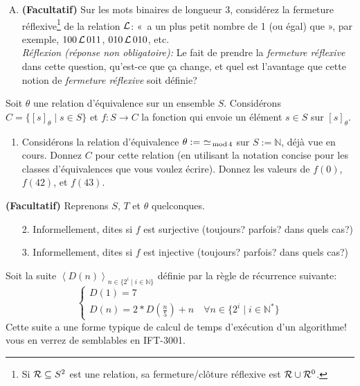 \documentclass[11pt]{article}
\newcommand{\tuple}[1]{\ensuremath{\left\langle #1 \right\rangle}}  %
\newcounter{exercice}\newcommand{\exercice}{ \bigskip \addtocounter{exercice}{1}\noindent \textbf{Exercice \theexercice}\\}
\renewcommand{\mod}{\textrm{\,mod\,}}
\begin{document}
\begin{enumerate}[B)]
\item \textbf{(Facultatif)}  Sur les mots binaires de longueur 3, considérez la fermeture réflexive\footnote{Si ${\cal R}\subseteq S^2$ est une relation, sa fermeture/clôture réflexive est ${\cal R}\cup {\cal R}^0$.} de la relation ${\cal L}$: «~a un plus petit nombre de 1  (ou égal) que », par exemple, $100\,{\cal L}\, 011$, $010\,{\cal L}\, 010$, etc. 
\\ \emph{Réflexion (réponse non obligatoire):} Le fait de prendre la \emph{fermeture réflexive} dans cette question, qu'est-ce que ça change, et quel est l'avantage que cette notion de \emph{fermeture réflexive} soit définie?
\end{enumerate}
\newpage

\exercice 
Soit $\theta$ une relation d'équivalence sur un ensemble $S$. Considérons $C = \{[s]_{\theta} \mid s\in S\}$ et $f: S\to C$ la fonction qui envoie un élément $s \in S$ sur $[s]_{\theta}$. 
\begin{enumerate}%
\item Considérons la relation d'équivalence $\theta:=~\simeq_{\mod 4}$ sur $S:=\mathbb{N}$, déjà vue en cours. Donnez $C$ pour cette relation (en utilisant la notation concise pour les classes d'équivalences que vous voulez écrire). Donnez les valeurs de $f(0)$, $f(42)$, et $f(43)$.
\end{enumerate}
\textbf{(Facultatif)} Reprenons $S$, $T$ et $\theta$  quelconques.
\begin{enumerate}
\item [2.]
Informellement, dites si $f$ est surjective (toujours? parfois? dans quels cas?)
\item[3.]
Informellement, dites si  $f$ est injective  (toujours? parfois? dans quels cas?)
\end{enumerate}



\exercice
 Soit   la suite $\tuple{D(n)}_{n\in\{2^i\mid i\in \mathbb{N}\}}$ définie par la règle de récurrence suivante:
 $$\begin{cases}
D(1)=7\\
D(n) = 2 * D( \frac{n}{5}) + n \quad \forall n \in \{2^i\mid i\in \mathbb{N}^*\}  
\end{cases}$$
Cette suite a une forme typique de calcul de temps d'exécution d'un algorithme! vous en verrez de semblables en IFT-3001.
\end{document}
